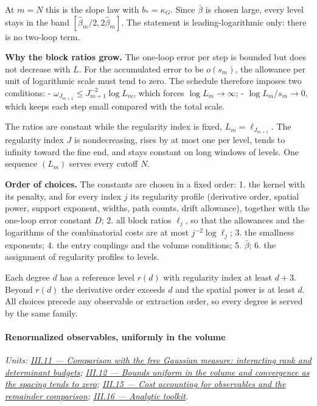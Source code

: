 \documentclass[
  letterpaper,
  11pt]{article}
\begin{document}
At \(m=N\) this is the slope law with \(b_\ast=\kappa_G\). Since
\(\bar\beta\) is chosen large, every level stays in the band
\([\hat\beta_m/2,2\hat\beta_m]\). The statement is leading-logarithmic
only: there is no two-loop term.

\textbf{Why the block ratios grow.} The one-loop error per step is
bounded but does not decrease with \(L\). For the accumulated error to
be \(o(s_m)\), the allowance per unit of logarithmic scale must tend to
zero. The schedule therefore imposes two conditions: -
\(\omega_{J_{m+1}}\le J_{m+1}^{-2}\log L_m\), which forces
\(\log L_m\to\infty\); - \(\log L_m/s_m\to0\), which keeps each step
small compared with the total scale.

The ratios are constant while the regularity index is fixed,
\(L_m=\ell_{J_{m+1}}\). The regularity index \(J\) is nondecreasing,
rises by at most one per level, tends to infinity toward the fine end,
and stays constant on long windows of levels. One sequence \((L_m)\)
serves every cutoff \(N\).

\textbf{Order of choices.} The constants are chosen in a fixed order: 1.
the kernel with its penalty, and for every index \(j\) its regularity
profile (derivative order, spatial power, support exponent, widths, path
counts, drift allowance), together with the one-loop error constant
\(D\); 2. all block ratios \(\ell_j\), so that the allowances and the
logarithms of the combinatorial costs are at most \(j^{-2}\log\ell_j\);
3. the smallness exponents; 4. the entry couplings and the volume
conditions; 5. \(\bar\beta\); 6. the assignment of regularity profiles
to levels.

Each degree \(d\) has a reference level \(r(d)\) with regularity index
at least \(d+3\). Beyond \(r(d)\) the derivative order exceeds \(d\) and
the spatial power is at least \(d\). All choices precede any observable
or extraction order, so every degree is served by the same family.

\paragraph{Renormalized observables, uniformly in the
volume}\label{renormalized-observables-uniformly-in-the-volume}

\emph{Units:
\href{https://github.com/scottnarmstrong/yang-mills-informalization/blob/main/outline/units/III-11.md}{III.11
--- Comparison with the free Gaussian measure: interacting rank and
determinant budgets};
\href{https://github.com/scottnarmstrong/yang-mills-informalization/blob/main/outline/units/III-12.md}{III.12
--- Bounds uniform in the volume and convergence as the spacing tends to
zero};
\href{https://github.com/scottnarmstrong/yang-mills-informalization/blob/main/outline/units/III-15.md}{III.15
--- Cost accounting for observables and the remainder comparison};
\href{https://github.com/scottnarmstrong/yang-mills-informalization/blob/main/outline/units/III-16.md}{III.16
--- Analytic toolkit}.}
\end{document}
